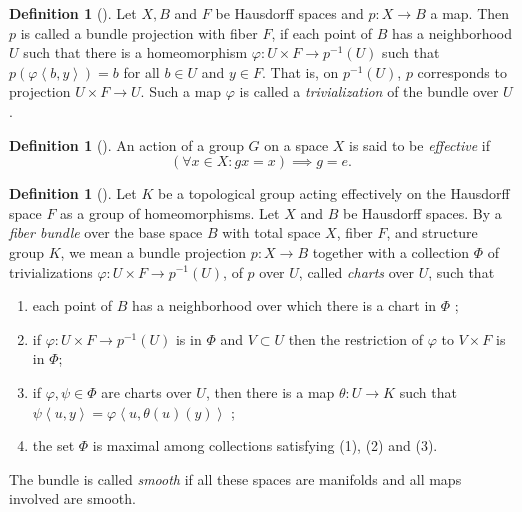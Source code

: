 \documentclass[reqno]{amsart}
\theoremstyle{definition}
\newtheorem{definition}[theorem]{Definition}
\theoremstyle{remark}
\begin{document}
\begin{definition}[]
    Let $X, B$ and $F$ be Hausdorff spaces and
    $p \colon X \to B$ a map.
    Then $p$ is called a bundle projection with
    fiber $F$, if each point of
    $B$ has a neighborhood $U$ such that there
    is a homeomorphism $\varphi \colon U \times F \to 
    p^{-1}(U) $ such that $p \left( \varphi
    \left<b,y  \right>\right) = b$ for all $b \in U$ and
    $y \in F$. That is, on  $p^{-1}(U)$, $p$ corresponds
    to projection $U \times F \to U$. Such a map
    $\varphi $ is called a \textit{trivialization} of the
    bundle over $U$.
\end{definition}

\begin{definition}[]
    An action of a group $G$ on a space $X$ is
    said to be \textit{effective} if
    \[
        \left( \forall x \in X \colon
        gx = x \right) \implies g = e.
    \] 
\end{definition}

\begin{definition}[]
    Let $K$ be a topological group acting effectively on
    the Hausdorff space $F$ as a group of homeomorphisms.
    Let $X$ and $B$ be Hausdorff spaces. By a 
    \textit{fiber bundle} over the base space $B$ with
    total space $X$, fiber $F$, and
    structure group $K$, we mean a bundle projection
    $p \colon X \to B$ together with a collection
    $\Phi $ of trivializations $\varphi \colon
    U \times F \to p^{-1}(U)$, of $p$ over $U$, called
    \textit{charts} over $U$, such that
    \begin{enumerate}
        \item each point of $B$ has a neighborhood
            over which there is a chart in $\Phi $ ;
        \item if $\varphi \colon U \times F \to 
            p^{-1}(U)$ is in $\Phi $ and
            $V \subset U$ then the restriction
            of $\varphi $ to $V \times F$ is in $\Phi$;
        \item if $\varphi, \psi \in \Phi$ are
            charts over $U$, then there is a map
            $\theta \colon U \to K$ such that
            $\psi \left<u,y \right> = 
            \varphi \left<u , \theta(u) (y) \right>$ ;
        \item the set $\Phi $ is maximal among
            collections satisfying (1), (2) and (3).
    \end{enumerate}

    The bundle is called \textit{smooth} if all these spaces
    are manifolds and all maps involved are smooth.
\end{definition}
\end{document}
